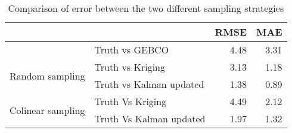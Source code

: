 \begin{table}
\centering
\caption{Comparison of error between the two different sampling strategies }
\label{tab:random-vs-colinear-sampling}
\begin{tabular}{llrr}
\toprule
 &  & RMSE & MAE \\
\midrule
 & Truth vs GEBCO & 4.48 & 3.31 \\
\cline{1-2}
\multirow[c]{2}{*}{Random sampling} & Truth vs Kriging & 3.13 & 1.18 \\
 & Truth vs Kalman updated & 1.38 & 0.89 \\
\cline{1-2}
\multirow[c]{2}{*}{Colinear sampling} & Truth Vs Kriging & 4.49 & 2.12 \\
 & Truth Vs Kalman updated & 1.97 & 1.32 \\
\cline{1-2}
\bottomrule
\end{tabular}
\end{table}
